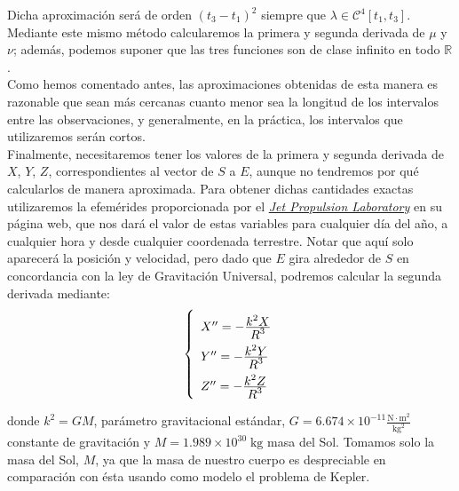 \documentclass[11pt]{article}
\newcommand\ddfrac[2]{\frac{\displaystyle #1}{\displaystyle #2}}
\begin{document}
Dicha aproximación será de orden $(t_3-t_1)^2$ siempre que $\lambda\in\mathcal{C}^4[t_1,t_3]$. Mediante este mismo método calcularemos la primera y segunda derivada de $\mu$ y $\nu$; además, podemos suponer que las tres funciones son de clase infinito en todo $\mathbb{R}$.\\

Como hemos comentado antes, las aproximaciones obtenidas de esta manera es razonable que sean más cercanas cuanto menor sea la longitud de los intervalos entre las observaciones, y generalmente, en la práctica, los intervalos que utilizaremos serán cortos.\\

Finalmente, necesitaremos tener los valores de la primera y segunda derivada de $X$, $Y$, $Z$, correspondientes al vector de $S$ a $E$, aunque no tendremos por qué calcularlos de manera aproximada. Para obtener dichas cantidades exactas utilizaremos la efemérides proporcionada por el \href{https://ssd.jpl.nasa.gov/horizons.cgi}{\textit{Jet Propulsion Laboratory}} en su página web, que nos dará el valor de estas variables para cualquier día del año, a cualquier hora y desde cualquier coordenada terrestre. Notar que aquí solo aparecerá la posición y velocidad, pero dado que $E$ gira alrededor de $S$ en concordancia con la ley de Gravitación Universal, podremos calcular la segunda derivada mediante:
\begin{align}
\left\{
\def\arraystretch{2}
\begin{array}{l}
	X'' = -\ddfrac{k^2X}{R^3}\\
	Y'' = -\ddfrac{k^2Y}{R^3}\\
	Z'' = -\ddfrac{k^2Z}{R^3}
\end{array}
\right.
\label{eq:ley_gravitacion_S_E}
\end{align}

\noindent donde $k^2=GM$, parámetro gravitacional estándar, $G=6.674\times10^{-11}\frac{\text{N}\cdot\text{m}^2}{\text{kg}^2}$ constante de gravitación y $M=1.989\times10^{30}\;\text{kg}$ masa del Sol. Tomamos solo la masa del Sol, $M$, ya que la masa de nuestro cuerpo es despreciable en comparación con ésta usando como modelo el problema de Kepler.\\



\end{document}
